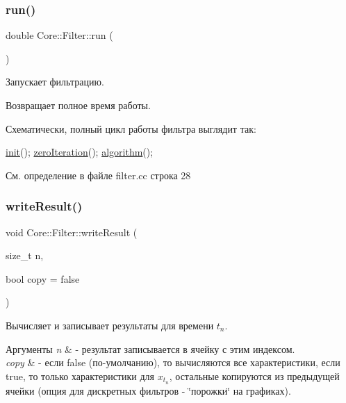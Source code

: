\subsubsection{\texorpdfstring{run()}{run()}}
{\footnotesize\ttfamily double Core\+::\+Filter\+::run (\begin{DoxyParamCaption}{ }\end{DoxyParamCaption})}



Запускает фильтрацию. 

\begin{DoxyReturn}{Возвращает}
полное время работы.
\end{DoxyReturn}
Схематически, полный цикл работы фильтра выглядит так\+: 
\begin{DoxyCode}
\hyperlink{class_core_1_1_filter_ae8bb3b004400941317a1e9fdc1ca2c58}{init}();
\hyperlink{class_core_1_1_filter_af95880b734c4b8dc3d8c02f222b32506}{zeroIteration}();
\hyperlink{class_core_1_1_filter_a438681ee3e54aba2148042d9f8011ab8}{algorithm}();
\end{DoxyCode}
 

См. определение в файле filter.\+cc строка 28

\hypertarget{class_core_1_1_filter_a84c7d1ebe3931974c3beccf27f13c1c5}{}\label{class_core_1_1_filter_a84c7d1ebe3931974c3beccf27f13c1c5} 
\subsubsection{\texorpdfstring{write\+Result()}{writeResult()}}
{\footnotesize\ttfamily void Core\+::\+Filter\+::write\+Result (\begin{DoxyParamCaption}\item[{size\+\_\+t}]{n,  }\item[{bool}]{copy = {\ttfamily false} }\end{DoxyParamCaption})\hspace{0.3cm}{\ttfamily [protected]}}



Вычисляет и записывает результаты для времени $t_n$. 


\begin{DoxyParams}{Аргументы}
{\em n} & -\/ результат записывается в ячейку с этим индексом. \\
\hline
{\em copy} & -\/ если false (по-\/умолчанию), то вычисляются все характеристики, если true, то только характеристики для $x_{t_n}$, остальные копируются из предыдущей ячейки (опция для дискретных фильтров -\/ \char`\"{}порожки\char`\"{} на графиках). \\
\hline
\end{DoxyParams}



